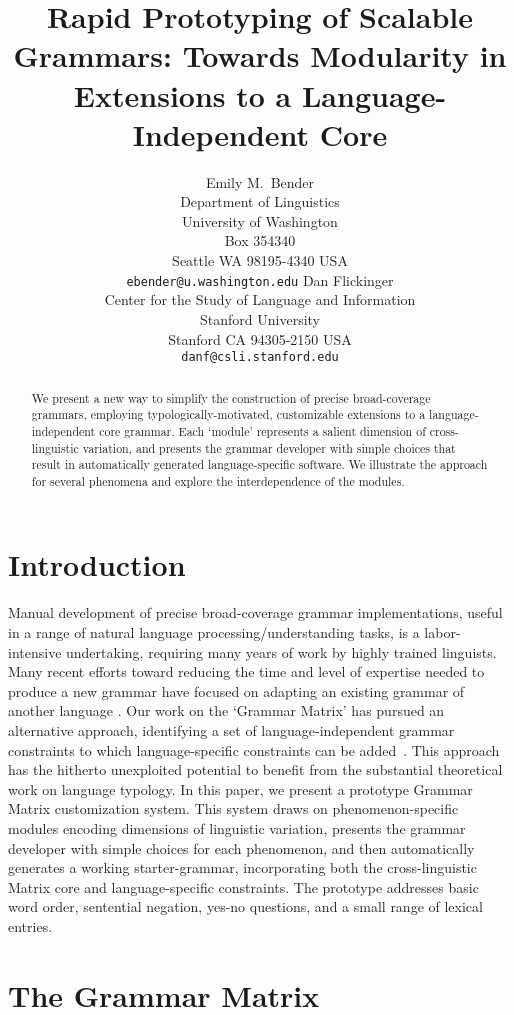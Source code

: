 \documentclass[11pt]{article}
\title{Rapid Prototyping of Scalable Grammars: Towards Modularity in Extensions to a Language-Independent Core}
\author{Emily M.~Bender\\
  Department of Linguistics\\
  University of Washington\\
  Box 354340\\
  Seattle WA 98195-4340 USA\\
  {\tt ebender@u.washington.edu} \And
  Dan Flickinger \\
  Center for the Study of Language and Information\\
  Stanford University\\
  Stanford CA 94305-2150 USA\\
  {\tt danf@csli.stanford.edu}}
\date{}
\begin{document}
\maketitle

\begin{abstract}
We present a new way to simplify the construction
of precise broad-coverage grammars, employing typologically-motivated,
customizable extensions to a language-independent core
grammar.  Each `module' represents a salient dimension of
cross-linguistic variation,
and
presents the grammar developer with simple choices that result in
automatically generated language-specific software.  We
illustrate the approach for several phenomena
and explore the interdependence of the modules.
\end{abstract}

\section{Introduction}

Manual development of precise broad-coverage grammar implementations,
useful in a range of natural language processing/understanding tasks,
is a labor-intensive undertaking, requiring many years of work by
highly trained linguists.  Many recent efforts toward reducing the
time and level of expertise needed to produce a new grammar have
focused on adapting an existing grammar of another language
\cite{Butt-et-al-02,Kim:Dal:Kap:Kin:Mas:Ohk:03,Bat:Kru:Kru:ta}.  Our
work on the `Grammar Matrix' has pursued an alternative approach,
identifying a set of language-independent grammar constraints to which
language-specific constraints can be added~\cite{Ben:Fli:Oe:02}.  This
approach has the hitherto unexploited potential to benefit from the
substantial theoretical work on language typology.
In this paper, we present a prototype Grammar Matrix
customization system.  This system draws on phenomenon-specific
modules encoding dimensions of linguistic variation, presents the
grammar developer with simple choices for each phenomenon, and then
automatically generates a working starter-grammar, incorporating both
the cross-linguistic Matrix core and language-specific constraints.
The prototype addresses basic word order, sentential
negation, yes-no questions, and a small range of lexical entries.

\section{The Grammar Matrix}
\end{document}
